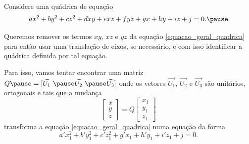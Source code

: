 \documentclass{beamer}
\begin{document}
\begin{frame}
    Considere uma quádrica de equação
    \begin{equation}\label{equacao_geral_quadrica}
        ax^2 + by^2 + cz^2 + dxy + exz + fyz + gx + hy + iz + j = 0.\pause
    \end{equation}

    Queremos remover os termos $xy$, \pause $xz$ \pause e $yz$ \pause da equação \eqref{equacao_geral_quadrica} \pause para então usar uma translação de eixos, \pause se necessário, \pause e com isso identificar a quádrica definida por tal equação.
\end{frame}

\begin{frame}
    Para isso, vamos tentar encontrar uma matriz $Q \pause = [\vec{U_1}\ \pause \vec{U_2}\ \pause \vec{U_3}]$ \pause onde os vetores $\vec{U_1}$, \pause $\vec{U_2}$ \pause e $\vec{U_3}$ \pause são unitários, \pause ortogonais \pause e tais que a mudança\pause
    \begin{equation}\label{substituicao_quadrica}
        \begin{bmatrix}
            x \\
            y \\
            z
        \end{bmatrix} = Q \begin{bmatrix}
            x_1 \\
            y_1 \\
            z_1
        \end{bmatrix}
    \end{equation}\pause
    transforma a equação \eqref{equacao_geral_quadrica} \pause numa equação da forma\pause
    \begin{equation}\label{equacao_rotacionada_quadrica}
        a'x_1^2 + b'y_1^2 + c'z_1^2 + g'x_1 + h'y_1 + i'z_1 + j = 0.
    \end{equation}
\end{frame}
\end{document}
